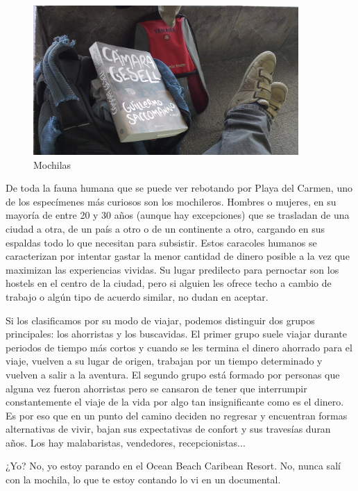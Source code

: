 \documentclass[11pt,twoside,openright,a6paper]{book}
\begin{document}
\begin{figure}[H]
  \centering
    \includegraphics[width=0.9\textwidth]{fotos/2013/mochila}
  \caption{Mochilas}
  \label{Mochilas}
\end{figure}

De toda la fauna humana que se puede ver rebotando por Playa del Carmen, uno
de los especímenes más curiosos son los mochileros. Hombres o mujeres,
en su mayoría de entre 20 y 30 años (aunque hay excepciones) que se
trasladan de una ciudad a otra, de un país a otro o de un continente a
otro, cargando en sus espaldas todo lo que necesitan para subsistir. Estos
caracoles humanos se caracterizan por intentar gastar la menor cantidad de
dinero posible a la vez que maximizan las experiencias vividas. Su lugar
predilecto para pernoctar son los hostels en el centro de la ciudad, pero
si alguien les ofrece techo a cambio de trabajo o algún tipo de acuerdo
similar, no dudan en aceptar.

Si los clasificamos por su modo de viajar, podemos distinguir dos grupos
principales: los ahorristas y los buscavidas. El primer grupo suele viajar
durante periodos de tiempo más cortos y cuando se les termina el dinero
ahorrado para el viaje, vuelven a su lugar de origen, trabajan por un
tiempo determinado y vuelven a salir a la aventura. El segundo grupo está
formado por personas que alguna vez fueron ahorristas pero se cansaron
de tener que interrumpir constantemente el viaje de la vida por algo tan
insignificante como es el dinero. Es por eso que en un punto del camino
deciden no regresar y encuentran formas alternativas de vivir, bajan sus
expectativas de confort y sus travesías duran años. Los hay malabaristas,
vendedores, recepcionistas...

¿Yo? No, yo estoy parando en el Ocean Beach Caribean Resort. No, nunca
salí con la mochila, lo que te estoy contando lo vi en un documental.
\end{document}
